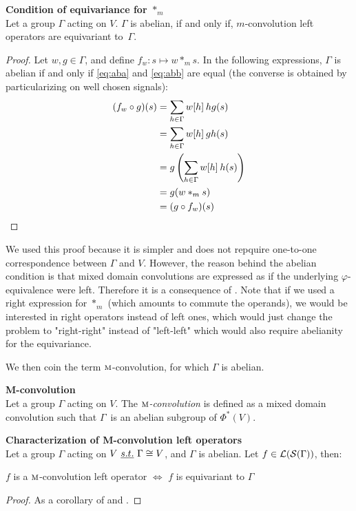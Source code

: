 \begin{proposition}\textbf{Condition of equivariance for $\ast_m$}\\
Let a group $\Gamma$ acting on $V$. $\Gamma$ is abelian, if and only if, $m$-convolution left operators are equivariant to~$\Gamma$.
\label{prop:equiM}
\end{proposition}
\begin{proof}
Let $w, g \in \Gamma$, and define $f_w: s \mapsto w \ast_m s$. In the following expressions, $\Gamma$ is abelian if and only if \eqref{eq:aba} and \eqref{eq:abb} are equal (the converse is obtained by particularizing on well chosen signals):
\begin{align}
(f_w \circ g) (s) & = \displaystyle \sum_{h \in \Gamma} w[h] \h{2} hg(s) \label{eq:aba}\\
 & = \displaystyle \sum_{h \in \Gamma} w[h] \h{2} gh(s) \label{eq:abb}\\
 & = \displaystyle g\left(\sum_{h \in \Gamma} w[h] \h{2} h(s)\right) \nn\\
 & = g(w \ast_m s ) \nn\\
 & = (g \circ f_w) (s) \nn
\end{align}
\end{proof}

\begin{remark}
We used this proof because it is simpler and does not repquire one-to-one correspondence between $\Gamma$ and $V$. However, the reason behind the abelian condition is that mixed domain convolutions are expressed as if the underlying $\varphi$-equivalence were left. Therefore it is a consequence of . Note that if we used a right expression for $\ast_m$ (which amounts to commute the operands), we would be interested in right operators instead of left ones, which would just change the problem to "right-right" instead of "left-left" which would also require abelianity for the equivariance.
\end{remark}

We then coin the term $\M$-convolution, for which $\Gamma$ is abelian.

\begin{definition}\textbf{M-convolution}\\
Let a group $\Gamma$ acting on $V$.
The \emph{$\M$-convolution} is defined as a mixed domain convolution such that $\Gamma$~is an abelian subgroup of $\Phi^*(V)$.
\end{definition}

\begin{corollary}\textbf{Characterization of M-convolution left operators}\\
Let a group $\Gamma$ acting on $V~\st \Gamma \cong V$, and $\Gamma$ is abelian. Let $f \in \cl(\cs(\Gamma))$, then:\\
\centerline{$f$ is a $\M$-convolution left operator $\Leftrightarrow$ $f$ is equivariant to $\Gamma$}
\label{cor:equiM}
\end{corollary}
\begin{proof}As a corollary of  and .
\end{proof}

